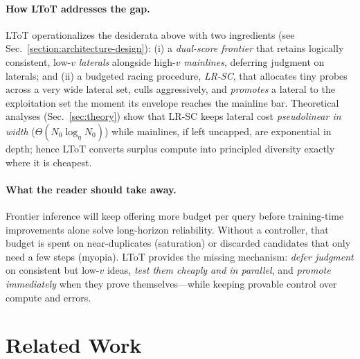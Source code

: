 \documentclass{article}
\begin{document}
\paragraph{How LToT addresses the gap.}
LToT operationalizes the desiderata above with two ingredients (see Sec.~\ref{section:architecture-design}):
(i) a \emph{dual-score frontier} that retains logically consistent, low-$v$ \emph{laterals} alongside high-$v$ \emph{mainlines}, deferring judgment on laterals; and
(ii) a budgeted racing procedure, \emph{LR-SC}, that allocates tiny probes across a very wide lateral set, culls aggressively, and \emph{promotes} a lateral to the exploitation set the moment its envelope reaches the mainline bar.
Theoretical analyses (Sec.~\ref{sec:theory}) show that LR-SC keeps lateral cost \emph{pseudolinear in width} ($\Theta(N_0\log_{\eta} N_0)$) while mainlines, if left uncapped, are exponential in depth; hence LToT converts surplus compute into principled diversity exactly where it is cheapest.

\paragraph{What the reader should take away.}
Frontier inference will keep offering more budget per query before training-time improvements alone solve long-horizon reliability.
Without a controller, that budget is spent on near-duplicates (saturation) or discarded candidates that only need a few steps (myopia).
LToT provides the missing mechanism: \emph{defer judgment} on consistent but low-$v$ ideas, \emph{test them cheaply and in parallel}, and \emph{promote immediately} when they prove themselves—while keeping provable control over compute and errors.

\section{Related Work}
\label{section:prior-work}
\end{document}
